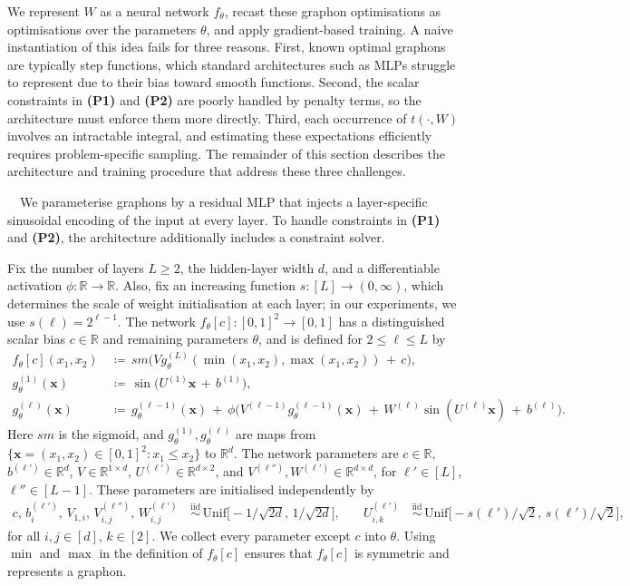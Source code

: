 \documentclass{article}
\theoremstyle{plain}
\theoremstyle{definition}
\theoremstyle{remark}
\newcommand*{\R}{\mathbb{R}}
\begin{document}
We represent $W$ as a neural network $f_\theta$, recast these graphon optimisations as optimisations over the parameters $\theta$, and apply gradient-based training. A naive instantiation of this idea fails for three reasons. First, known optimal graphons are typically step functions, which standard architectures such as MLPs struggle to represent due to their bias toward smooth functions. Second, the scalar constraints in \textbf{(P1)} and \textbf{(P2)} are poorly handled by penalty terms, so the architecture must enforce them more directly. Third, each occurrence of $t(\cdot, W)$ involves an intractable integral, and estimating these expectations efficiently requires problem-specific sampling. The remainder of this section describes the architecture and training procedure that address these three challenges.

\ $\,$
We parameterise graphons by a residual MLP that injects a layer-specific sinusoidal encoding of the input at every layer. To handle constraints in \textbf{(P1)} and \textbf{(P2)}, the architecture additionally includes a constraint solver.

Fix the number of layers $L \ge 2$, the hidden-layer width $d$, and a differentiable activation $\phi : \R \to \R$. Also, fix an increasing function $s : [L] \to (0, \infty)$, which determines the scale of weight initialisation at each layer; in our experiments, we use $s(\ell) = 2^{\ell-1}$. The network $f_\theta[c] : [0,1]^2 \to [0,1]$ has a distinguished scalar bias $c \in \R$ and remaining parameters $\theta$, and is defined for $2 \le \ell \le L$ by
\begin{align*}
f_{\theta}[c](x_1, x_2) & \,\coloneqq\, \mathit{sm}\bigl(V g^{(L)}_\theta(\min(x_1, x_2), \max(x_1, x_2)) \,+\, c\bigr),
\\
g^{(1)}_\theta(\mathbf{x}) & \,\coloneqq\, \sin\bigl(U^{(1)} \mathbf{x} \,+\, b^{(1)}\bigr),
\\
g^{(\ell)}_\theta(\mathbf{x}) & \,\coloneqq\, g_\theta^{(\ell-1)}(\mathbf{x}) \,+\, \phi\bigl(V^{(\ell-1)} g_\theta^{(\ell-1)}(\mathbf{x}) \,+\, W^{(\ell)} \sin(U^{(\ell)} \mathbf{x}) \,+\, b^{(\ell)}\bigr).
\end{align*}
Here $\mathit{sm}$ is the sigmoid, and $g^{(1)}_\theta, g^{(\ell)}_\theta$ are maps from $\{\mathbf{x} = (x_1, x_2) \in [0,1]^2 : x_1 \le x_2\}$ to $\R^d$. The network parameters are
$c \in \R$, $b^{(\ell')} \in \R^d$, $V \in \R^{1 \times d}$, $U^{(\ell')} \in \R^{d \times 2}$, and $V^{(\ell'')}, W^{(\ell')} \in \R^{d \times d}$, for $\ell' \in [L]$, $\ell'' \in [L-1]$. These parameters are initialised independently by
\begin{align*}
c,\, b^{(\ell')}_i,\, V_{1,i},\, V^{(\ell'')}_{i,j},\, W^{(\ell')}_{i,j}
&\,\stackrel{\mathrm{iid}}{\sim}\, \mathrm{Unif}\bigl[-1/\sqrt{2d},\, 1/\sqrt{2d}\bigr],
&
\quad
U^{(\ell')}_{i,k}
&\,\stackrel{\mathrm{iid}}{\sim}\, \mathrm{Unif}\bigl[-s(\ell')/\sqrt{2},\, s(\ell')/\sqrt{2}\bigr],
\end{align*}
for all $i, j \in [d]$, $k \in [2]$. We collect every parameter except $c$ into $\theta$. Using $\min$ and $\max$ in the definition of $f_\theta[c]$ ensures that $f_\theta[c]$ is symmetric and represents a graphon.
\end{document}
